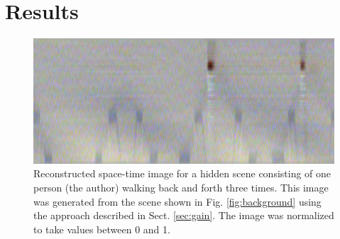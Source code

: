 \documentclass{article}
\begin{document}
\section{Results}

\begin{figure}[htbp]
	\includegraphics[width=\textwidth]{img/trace.png}
	\caption{Reconstructed space-time image for a hidden scene consisting of one person (the author) walking back and forth three times. This image was generated from the scene shown in Fig. \ref{fig:background} using the approach described in Sect. \ref{sec:gain}. The image was normalized to take values between 0 and 1.}
	\label{fig:trace}
\end{figure}
\end{document}
